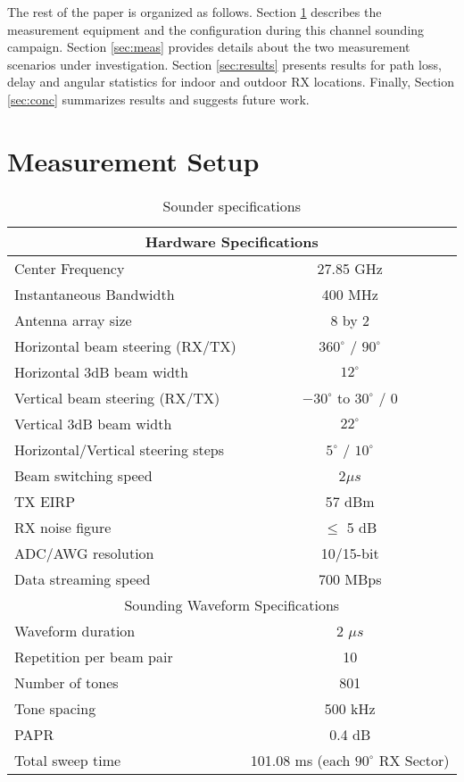 \documentclass[conference]{IEEEtran}
\begin{document}
The rest of the paper is organized as follows. Section \ref{sec:setup} describes the measurement equipment and the configuration during this channel sounding campaign. Section \ref{sec:meas} provides details about the two measurement scenarios under investigation. Section \ref{sec:results} presents results for path loss, delay and angular statistics for indoor and outdoor RX locations. Finally, Section \ref{sec:conc} summarizes results and suggests future work.


\section{Measurement Setup}  \label{sec:setup}
  \normalsize
  \begin{table}[tbp]\centering
  \caption{Sounder specifications}
  \renewcommand{\arraystretch}{1.3}
\begin{tabular}{l|c}
    \hline
    \multicolumn{2}{c}{Hardware Specifications} \\ \hline \hline
    Center Frequency & 27.85 GHz\\
    Instantaneous Bandwidth & 400 MHz\\
    Antenna array size & 8 by 2 \\
    Horizontal beam steering (RX/TX)& $360^\circ$ / $90^\circ$\\
    Horizontal 3dB beam width & $12^\circ$\\
    Vertical beam steering (RX/TX) & $-30^\circ$ to $30^\circ$ / 0 \\
    Vertical 3dB beam width & $22^\circ$\\
    Horizontal/Vertical steering steps & $5^\circ$ / $10^\circ$\\
    Beam switching speed & 2$\mu s$ \\
    TX EIRP & 57 dBm \\
    RX noise figure & $\le$ 5 dB \\ 
    ADC/AWG resolution & 10/15-bit \\
    Data streaming speed & 700 MBps \\ \hline
    \multicolumn{2}{c}{Sounding Waveform Specifications} \\ \hline \hline
    Waveform duration & 2 $\mu s$ \\
    Repetition per beam pair & 10 \\
    Number of tones & 801 \\
    Tone spacing & 500 kHz \\
    PAPR & 0.4 dB \\ 
    Total sweep time & 101.08 ms (each $90^\circ$ RX Sector)\\ \hline      
  \end{tabular} \label{specs}
\end{table}
\end{document}
